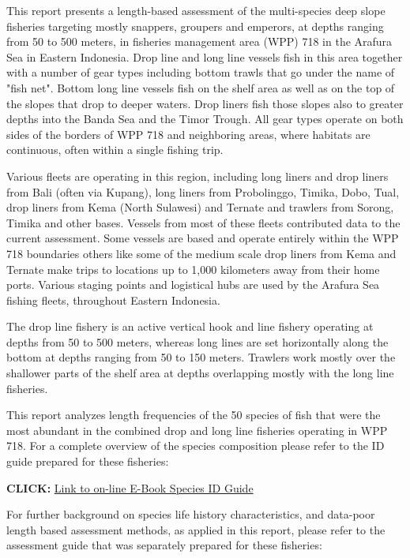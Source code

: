 This report presents a length-based assessment of the multi-species deep slope fisheries targeting mostly snappers, groupers and emperors, at depths ranging from 50 to 500 meters, in fisheries management area (WPP) 718 in the Arafura Sea in Eastern Indonesia. Drop line and long line vessels fish in this area together with a number of gear types including bottom trawls that go under the name of "fish net". Bottom long line vessels fish on the shelf area as well as on the top of the slopes that drop to deeper waters. Drop liners fish those slopes also to greater depths into the Banda Sea and the Timor Trough. All gear types operate on both sides of the borders of WPP 718 and neighboring areas, where habitats are continuous, often within a single fishing trip.

Various fleets are operating in this region, including long liners and drop liners from Bali (often via Kupang), long liners from Probolinggo, Timika, Dobo, Tual, drop liners from Kema (North Sulawesi) and Ternate and trawlers from Sorong, Timika and other bases. Vessels from most of these fleets contributed data to the current assessment. Some vessels are based and operate entirely within the WPP 718 boundaries others like some of the medium scale drop liners from Kema and Ternate make trips to locations up to 1,000 kilometers away from their home ports. Various staging points and logistical hubs are used by the Arafura Sea fishing fleets, throughout Eastern Indonesia.

The drop line fishery is an active vertical hook and line fishery operating at depths from 50 to 500 meters, whereas long lines are set horizontally along the bottom at depths ranging from 50 to 150 meters. Trawlers work mostly over the shallower parts of the shelf area at depths overlapping mostly with the long line fisheries.

This report analyzes length frequencies of the 50 species of fish that were the most abundant in the combined drop and long line fisheries operating in WPP 718. For a complete overview of the species composition please refer to the ID guide prepared for these fisheries:

\textbf{CLICK: }\href{http://72.14.187.103:8080/ifish/pub/TNC_FishID.pdf}{Link to on-line E-Book Species ID Guide}

For further background on species life history characteristics, and data-poor length based assessment methods, as applied in this report, please refer to the assessment guide that was separately prepared for these fisheries:

